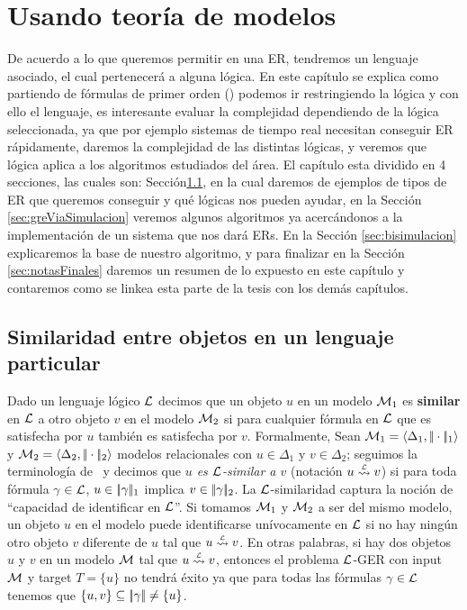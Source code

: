 \chapter{Usando teor\'ia de modelos}
\label{sec:intro_logica}

De acuerdo a lo que queremos permitir en una ER, tendremos un lenguaje asociado, el cual pertenecer\'a a alguna l\'ogica. En este cap\'itulo se explica como partiendo de f\'ormulas de primer orden (\FOL) podemos ir restringiendo la l\'ogica y con ello el lenguaje, es interesante evaluar la complejidad dependiendo de la l\'ogica seleccionada, ya que por ejemplo sistemas de tiempo real necesitan conseguir ER r\'apidamente, daremos la complejidad de las distintas l\'ogicas, y veremos que l\'ogica aplica a los algoritmos estudiados del \'area.
El cap\'itulo esta dividido en 4 secciones, las cuales son: Secci\'on\ref{sec:seleccionandoLenguaje}, en la cual daremos de ejemplos de tipos de ER que queremos conseguir y qu\'e l\'ogicas nos pueden ayudar, en la Secci\'on \ref{sec:greViaSimulacion} veremos algunos algoritmos ya acerc\'andonos a la implementaci\'on de un sistema que nos dar\'a ERs. En la Secci\'on \ref{sec:bisimulacion} explicaremos la base de nuestro algoritmo, y para finalizar en la Secci\'on \ref{sec:notasFinales} daremos un resumen de lo expuesto en este cap\'itulo y contaremos como se linkea esta parte de la tesis con los dem\'as cap\'itulos.


\section{Similaridad entre objetos en un lenguaje particular}
\label{sec:seleccionandoLenguaje}

Dado un lenguaje l\'ogico $\mathcal{L}$ decimos que un objeto $u$ en un modelo
$\mathcal{M}_1$ es {\bf similar} en $\mathcal{L}$ a otro objeto
 $v$ en el modelo $\mathcal{M}_2$ si para cualquier f\'ormula en $\mathcal{L}$ que es satisfecha por $u$ tambi\'en es satisfecha por $v$. Formalmente,
Sean $\mathcal{M}_1 = \langle \Delta_1, |\!|\cdot|\!|_1 \rangle$ y $\mathcal{M}_2 = \langle \Delta_2, |\!|\cdot|\!|_2 \rangle$ modelos relacionales con $u \in \Delta_1$ y $v \in \Delta_2$; seguimos la terminolog\'ia de~\cite{areces08} y decimos que
\emph{$u$ es $\mathcal{L}$-similar a $v$}  (notaci\'on $u \simil{\+L} v$) si para toda f\'ormula $\gamma \in \mathcal{L}$, $u \in |\!|\gamma|\!|_1$ implica
$v \in |\!|\gamma|\!|_2$. 
La $\mathcal{L}$-similaridad captura la noci\'on de ``capacidad de identificar en $\mathcal{L}$''. Si tomamos $\mathcal{M}_1$ y $\mathcal{M}_2$ a ser del mismo modelo, un objeto $u$ en el modelo puede identificarse un\'ivocamente en $\mathcal{L}$ si no hay ning\'un otro objeto $v$ diferente de $u$ tal que $u \simil{\+L} v$. En otras palabras, si hay dos objetos $u$ y $v$ en un modelo $\mathcal{M}$  tal que
$u \simil{\+L} v$, entonces el problema $\mathcal{L}$-GER con input $\mathcal{M}$ y target $T=\{u\}$ no tendr\'a \'exito ya que para todas las f\'ormulas $\gamma \in \mathcal{L}$ tenemos que $\{u,v\} \subseteq |\!|\gamma|\!| \not = \{u\}$.

